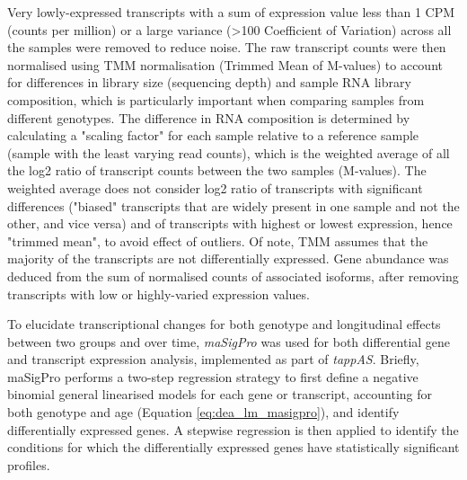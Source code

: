 Very lowly-expressed transcripts with a sum of expression value less than 1 CPM (counts per million) or a large variance (>100 Coefficient of Variation) across all the samples were removed to reduce noise. The raw transcript counts were then normalised using TMM normalisation \cite{Robinson2010} (Trimmed Mean of M-values) to account for differences in library size (sequencing depth) and sample RNA library composition, which is particularly important when comparing samples from different genotypes. The difference in RNA composition is determined by calculating a "scaling factor" for each sample relative to a reference sample (sample with the least varying read counts), which is the weighted average of all the log2 ratio of transcript counts between the two samples (M-values). The weighted average does not consider log2 ratio of transcripts with significant differences ("biased" transcripts that are widely present in one sample and not the other, and vice versa) and of transcripts with highest or lowest expression, hence "trimmed mean", to avoid effect of outliers. Of note, TMM assumes that the majority of the transcripts are not differentially expressed. Gene abundance was deduced from the sum of normalised counts of associated isoforms, after removing transcripts with low or highly-varied expression values.     

To elucidate transcriptional changes for both genotype and longitudinal effects between two groups and over time, \textit{maSigPro} \cite{Conesa2006,Nueda2014,Conesa2017} was used for both differential gene and transcript expression analysis, implemented as part of \textit{tappAS}. Briefly, maSigPro performs a two-step regression strategy to first define a negative binomial general linearised models\cite{Nueda2014} for each gene or transcript, accounting for both genotype and age (Equation \cref{eq:dea_lm_masigpro}), and identify differentially expressed genes. A stepwise regression is then applied to identify the conditions for which the differentially expressed genes have statistically significant profiles.  


